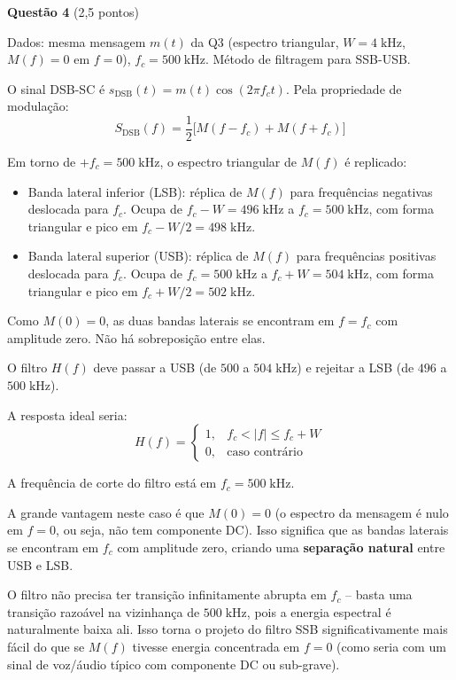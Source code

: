 \documentclass[11pt,a4paper]{article}
\begin{document}
\textbf{Questão 4} \hfill (2{,}5 pontos)

Dados: mesma mensagem $m(t)$ da Q3 (espectro triangular, $W = 4\;\text{kHz}$, $M(f) = 0$ em $f = 0$), $f_c = 500\;\text{kHz}$. Método de filtragem para SSB-USB.

\begin{resolucao}

O sinal DSB-SC é $s_{\text{DSB}}(t) = m(t)\cos(2\pi f_c t)$. Pela propriedade de modulação:
\[
  S_{\text{DSB}}(f) = \frac{1}{2}\big[M(f - f_c) + M(f + f_c)\big]
\]

Em torno de $+f_c = 500\;\text{kHz}$, o espectro triangular de $M(f)$ é replicado:
\begin{itemize}
  \item Banda lateral inferior (LSB): réplica de $M(f)$ para frequências negativas deslocada para $f_c$. Ocupa de $f_c - W = 496\;\text{kHz}$ a $f_c = 500\;\text{kHz}$, com forma triangular e pico em $f_c - W/2 = 498\;\text{kHz}$.
  \item Banda lateral superior (USB): réplica de $M(f)$ para frequências positivas deslocada para $f_c$. Ocupa de $f_c = 500\;\text{kHz}$ a $f_c + W = 504\;\text{kHz}$, com forma triangular e pico em $f_c + W/2 = 502\;\text{kHz}$.
\end{itemize}

Como $M(0) = 0$, as duas bandas laterais se encontram em $f = f_c$ com amplitude zero. Não há sobreposição entre elas.
\end{resolucao}

\begin{resolucao}

O filtro $H(f)$ deve passar a USB (de $500$ a $504\;\text{kHz}$) e rejeitar a LSB (de $496$ a $500\;\text{kHz}$).

A resposta ideal seria:
\[
  H(f) = \begin{cases} 1, & f_c < |f| \leq f_c + W \\ 0, & \text{caso contrário} \end{cases}
\]

A frequência de corte do filtro está em $f_c = 500\;\text{kHz}$.

A grande vantagem neste caso é que $M(0) = 0$ (o espectro da mensagem é nulo em $f = 0$, ou seja, não tem componente DC). Isso significa que as bandas laterais se encontram em $f_c$ com amplitude zero, criando uma \textbf{separação natural} entre USB e LSB.

O filtro não precisa ter transição infinitamente abrupta em $f_c$ -- basta uma transição razoável na vizinhança de $500\;\text{kHz}$, pois a energia espectral é naturalmente baixa ali. Isso torna o projeto do filtro SSB significativamente mais fácil do que se $M(f)$ tivesse energia concentrada em $f = 0$ (como seria com um sinal de voz/áudio típico com componente DC ou sub-grave).
\end{resolucao}
\end{document}
